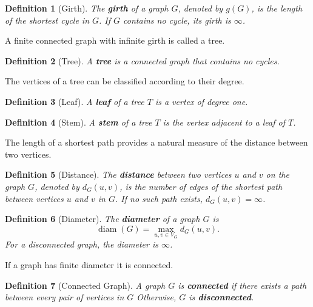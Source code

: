 \documentclass[11pt]{report}
\newtheorem{definition}{Definition}[section]
\begin{document}
\begin{definition}[Girth] \label{def::girth}
  The \textbf{girth} of a graph $G$, denoted by $g(G)$, is the length of the shortest cycle in $G$. If $G$ contains no cycle, its girth is $\infty$.
\end{definition}

A finite connected graph with infinite girth is called a tree.

\begin{definition}[Tree] \label{def::tree}
  A \textbf{tree} is a connected graph that contains no cycles.
\end{definition}

The vertices of a tree can be classified according to their degree. 

\begin{definition}[Leaf] \label{def::leaf}
  A \textbf{leaf} of a tree $T$ is a vertex of degree one.
\end{definition}

\begin{definition}[Stem] \label{def::stem}
  A \textbf{stem} of a tree $T$ is the vertex adjacent to a leaf of
  $T$.
\end{definition}

The length of a shortest path provides a natural measure of the distance between two vertices.

\begin{definition}[Distance] \label{def::distance}
  The \textbf{distance} between two vertices $u$ and $v$ on the graph $G$, denoted by $d_G(u,v)$, is the number of edges of the shortest path between vertices $u$ and $v$ in $G$. If no such path exists, $d_G(u,v) = \infty$. 
\end{definition}

\begin{definition}[Diameter] \label{def::diameter}
  The \textbf{diameter} of a graph $G$ is
  \[
  \operatorname{diam}(G) = \max_{u,v\in V_G}d_G(u,v).
  \]
  For a disconnected graph, the diameter is $\infty$.
\end{definition}

If a graph has finite diameter it is connected. 

\begin{definition}[Connected Graph] \label{def::connected_graph}
  A graph $G$ is \textbf{connected} if there exists a path between every pair of vertices in $G$ Otherwise, $G$ is \textbf{disconnected}.
\end{definition}
\end{document}
